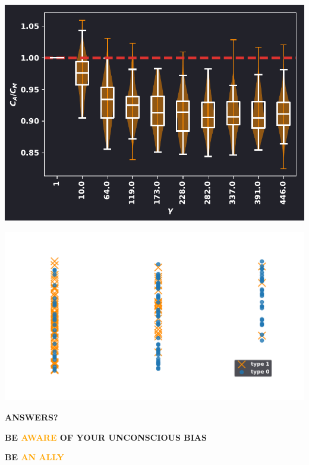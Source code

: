 \documentclass{beamer}
\begin{document}
\begin{frame}[fragile]
    \begin{center}
    \includegraphics[width=.7\textwidth]{static/ratio_over_gammas.pdf}
    \end{center}
\end{frame}

\begin{frame}
        \centering
\end{frame}

\begin{frame}[fragile]
    \begin{center}
    \includegraphics[width=.7\textwidth]{static/exit_levels.pdf}
    \end{center}
\end{frame}

\begin{frame}
    \centering
    \LARGE \textbf{ANSWERS?}
\end{frame}

\begin{frame}
    \centering
    \LARGE \textbf{BE \textcolor{orange}{AWARE} OF YOUR UNCONSCIOUS BIAS}
\end{frame}

\begin{frame}
    \centering
    \LARGE \textbf{BE \textcolor{orange}{AN ALLY}}
\end{frame}
\end{document}
